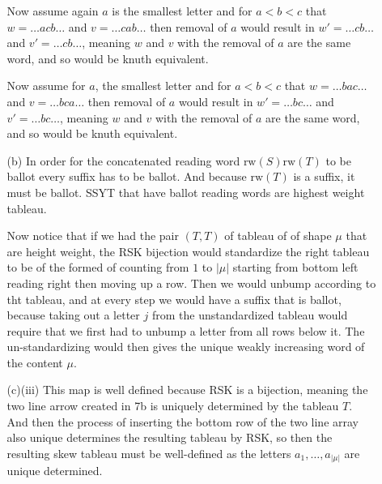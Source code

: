 \documentclass[12pt]{amsart}
\begin{document}
\begin{itemize}
\begin{itemize}
        Now assume again $a$ is the smallest letter and for $a<b<c$ that 
        $w=\dots acb\dots$ and $v=\dots cab\dots$ then removal of $a$ would result in
        $w'=\dots cb\dots$ and $v'=\dots cb\dots$, meaning $w$ and $v$ with the removal of 
        $a$ are the same word, and so would be knuth equivalent.

        Now assume for $a$, the smallest letter and for $a<b<c$ that 
        $w=\dots bac\dots$ and $v=\dots bca\dots$ then removal of $a$ would result in
        $w'=\dots bc\dots$ and $v'=\dots bc\dots$, meaning $w$ and $v$ with the removal of 
        $a$ are the same word, and so would be knuth equivalent.\\


        \item[(b)] %
        In order for the concatenated reading word $\text{rw}(S)\text{rw}(T)$ to be ballot
        every suffix has to be ballot. And because $\text{rw}(T)$ is a suffix, it must be ballot.
        SSYT that have ballot reading words are highest weight tableau.
        
        Now notice that if we had the pair $(T,T)$ of tableau of of shape $\mu$ 
        that are height weight, the RSK bijection would standardize the right tableau to 
        be of the formed of counting from $1$ to $|\mu|$ starting from bottom left 
        reading right then moving up a row. Then we would unbump according to tht tableau, and
        at every step we would have a suffix that is ballot, because taking out a letter $j$ 
        from the unstandardized tableau would require that we first had to 
        unbump a letter from all rows below it.
        The un-standardizing would then gives the unique weakly increasing word 
        of the content $\mu$.\\

        \item[(c)(iii)] %
        This map is well defined because RSK is a bijection, meaning the two 
        line arrow created in 7b is uniquely determined by the tableau $T$. And then the process of
        inserting the bottom row of the two line array also unique determines the resulting tableau by RSK,
        so then the resulting skew tableau must be well-defined as 
        the letters $a_1,\dots, a_{|\mu|}$ are unique determined. 
    \end{itemize}
\end{itemize}
\end{document}
